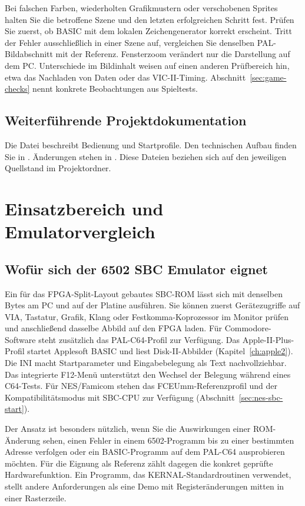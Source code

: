\documentclass[fontsize=10.2bp,DIV=calc,oneside,open=any,headings=normal,numbers=noenddot]{scrbook}
\begin{document}
Bei falschen Farben, wiederholten Grafikmustern oder verschobenen Sprites
halten Sie die betroffene Szene und den letzten erfolgreichen Schritt fest.
Prüfen Sie zuerst, ob BASIC mit dem lokalen Zeichengenerator korrekt
erscheint. Tritt der Fehler ausschließlich in einer Szene auf, vergleichen
Sie denselben PAL-Bildabschnitt mit der Referenz. Fensterzoom verändert nur
die Darstellung auf dem PC. Unterschiede im Bildinhalt weisen auf einen
anderen Prüfbereich hin, etwa das Nachladen von Daten oder das VIC-II-Timing.
Abschnitt~\ref{sec:game-checks} nennt konkrete Beobachtungen aus Spieltests.

\section{Weiterführende Projektdokumentation}
Die Datei  beschreibt Bedienung und Startprofile. Den
technischen Aufbau finden Sie in . Änderungen stehen
in . Diese Dateien beziehen sich auf den jeweiligen
Quellstand im Projektordner.

\chapter{Einsatzbereich und Emulatorvergleich}\label{ch:comparison}

\section{Wofür sich der 6502 SBC Emulator eignet}
Ein für das FPGA-Split-Layout gebautes SBC-ROM lässt sich mit denselben
Bytes am PC und auf der Platine ausführen. Sie können zuerst
Gerätezugriffe auf VIA, Tastatur, Grafik, Klang oder Festkomma-Koprozessor
im Monitor prüfen und anschließend dasselbe Abbild auf den FPGA laden.
Für Commodore-Software steht zusätzlich das PAL-C64-Profil zur Verfügung.
Das Apple-II-Plus-Profil startet Applesoft BASIC und liest Disk-II-Abbilder
(Kapitel~\ref{ch:apple2}).
Die INI macht Startparameter und Eingabebelegung als Text nachvollziehbar.
Das integrierte F12-Menü unterstützt den Wechsel der Belegung während
eines C64-Tests. Für NES/Famicom stehen das FCEUmm-Referenzprofil und
der Kompatibilitätsmodus mit SBC-CPU zur Verfügung
(Abschnitt~\ref{sec:nes-sbc-start}).

Der Ansatz ist besonders nützlich, wenn Sie die Auswirkungen einer
ROM-Änderung sehen, einen Fehler in einem 6502-Programm bis zu einer
bestimmten Adresse verfolgen oder ein BASIC-Programm auf dem PAL-C64
ausprobieren möchten. Für die Eignung als Referenz zählt dagegen die
konkret geprüfte Hardwarefunktion. Ein Programm, das KERNAL-Standardroutinen
verwendet, stellt andere Anforderungen als eine Demo mit Registeränderungen
mitten in einer Rasterzeile.
\end{document}
